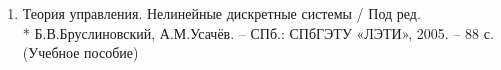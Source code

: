\begin{enumerate}
	\item 
	Теория управления. Нелинейные дискретные системы / Под ред.\\*
	 Б.В.Бруслиновский, 
	А.М.Усачёв. – СПб.: СПбГЭТУ «ЛЭТИ», 2005. – 88 с. (Учебное пособие)

\end{enumerate}
	